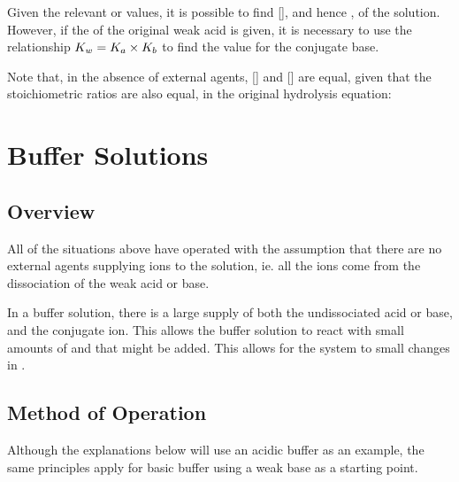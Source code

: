			Given the relevant \Ka{} or \Kb{} values, it is possible to find [], and hence \pH{}, of the solution. However,
			if the \Ka{} of the original weak acid is given, it is necessary to use the relationship $K_{w} = K_{a} \times K_{b}$ to find
			the \Kb{} value for the conjugate base.

			\mathdiagram{
				\[ \MKb = \frac{\MKw}{\MKa}  \hspace{15mm}  \MKb = \frac{[\ch{CH3CO2H}][\ch{OH-}]}{[\ch{CH3CO2-}]} \]
			}
			Note that, in the absence of external agents, [] and [] are equal, given that the stoichiometric ratios
			are also equal, in the original hydrolysis equation:





	\section{Buffer Solutions}

		\subsection{Overview}

			All of the situations above have operated with the assumption that there are no external agents supplying ions to the solution,
			ie. all the ions come from the dissociation of the weak acid or base.

			In a buffer solution, there is a large supply of both the undissociated acid or base, and the conjugate ion. This allows the
			buffer solution to react with small amounts of   and  that might be added. This allows for the system
			to  small changes in \pH{}.



		\subsection{Method of Operation}

			Although the explanations below will use an acidic buffer as an example, the same principles apply for basic buffer using a weak
			base as a starting point.

